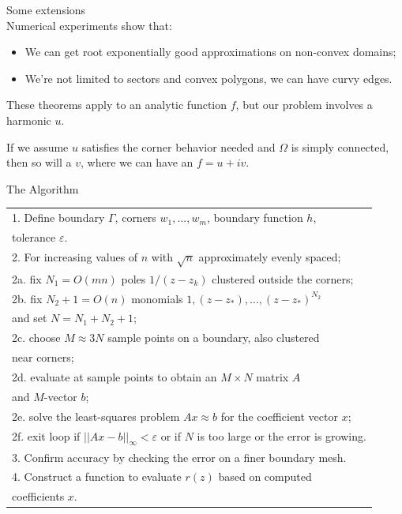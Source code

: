 \documentclass{seminar}
\begin{document}
\begin{slide} %
\large Some extensions \\

\small
Numerical experiments show that:
\begin{itemize}
	\item We can get root exponentially good approximations on non-convex domains;
	\item We're not limited to sectors and convex polygons, we can have curvy edges.
\end{itemize}
These theorems apply to an analytic function $f$, but our problem involves a harmonic $u$. 

If we assume $u$ satisfies the corner behavior needed and $\Omega$ is simply connected, then so will a $v$, where we can have an $f=u+iv$.
\end{slide} %




\begin{slide} %
\large The Algorithm 
\small
\begin{table}[h]
	\begin{tabular}{l}
		1. Define boundary $\Gamma$, corners $w_1,\ldots, w_m$, boundary function $h$,\\ tolerance $\varepsilon$.	\\
		2. For increasing values of $n$ with $\sqrt{n}$	approximately evenly spaced; \\
		\: 2a. fix $N_1=O(mn)$ poles $1/(z-z_k)$ clustered outside the corners; \\
		\: 2b. fix $N_2+1=O(n)$ monomials $1,(z-z_*),\ldots,(z-z_*)^{N_2}$\\ and set $N=N_1+N_2+1$; \\
		\: 2c. choose $M\approx 3N$ sample points on a boundary, also clustered\\ near corners; \\
		\: 2d. evaluate at sample points to obtain an $M\times N$ matrix $A$\\ and $M$-vector $b$; \\
		\: 2e. solve the least-squares problem $Ax\approx b$ for the coefficient vector $x$; \\
		\: 2f. exit loop if $||Ax-b||_\infty < \varepsilon$ or if $N$ is too large or the error is growing. \\
		3. Confirm accuracy by checking the error on a finer boundary mesh. \\
		4. Construct a function to evaluate $r(z)$ based on computed\\ coefficients $x$.
	\end{tabular}
\end{table}
\end{slide} %
\end{document}
